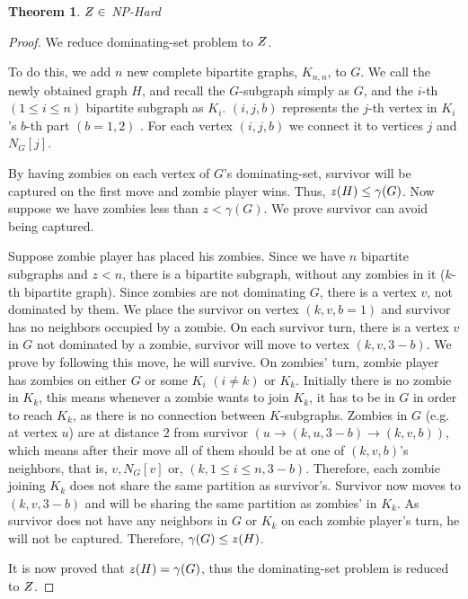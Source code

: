 \documentclass[1p]{elsarticle}
\newtheorem{theorem}{Theorem}
\newcommand{\NPZ}{\ooalign{$Z$\cr\hfil\rule[.8ex]{.3em}{.09ex}\hfil\cr}}
\newcommand{\zn}{\ooalign{$z$\cr\hfil\rule[.5ex]{.2em}{.08ex}\hfil\cr}}
\begin{document}
	\begin{theorem}
		$\NPZ \in$ NP-Hard
	\end{theorem}
	\begin{proof}
		We reduce dominating-set problem to $\NPZ$.

		To do this, we add $n$ new complete bipartite graphs, $K_{n,n}$, to $G$. We call the newly obtained graph $H$,
		and recall the $G$-subgraph simply as $G$, and the $i$-th $(1 \leq i \leq n)$ bipartite subgraph as $K_i$.
		$(i,j,b)$ represents the $j$-th vertex in $K_i$'s $b$-th part $(b = 1,2)$ . For each vertex $(i,j,b)$ we connect
		it to vertices $j$ and $N_G[j]$.

		By having zombies on each vertex of $G$'s dominating-set, survivor will be captured on the first move and zombie
		player wins. Thus, $\zn(H) \leq \gamma(G)$. Now suppose we have zombies less than $z < \gamma(G)$. We prove
		survivor can avoid being captured.

		Suppose zombie player has placed his zombies. Since we have $n$ bipartite subgraphs and $z < n$, there is a
		bipartite subgraph, without any zombies in it ($k$-th bipartite graph). Since zombies are not dominating $G$,
		there is a vertex $v$, not dominated by them. We place the survivor on vertex $(k,v,b = 1)$ and survivor has no
		neighbors occupied by a zombie. On each survivor turn, there is a vertex $v$ in $G$ not dominated by a zombie,
		survivor will move to vertex $(k,v,3 - b)$. We prove by following this move, he will survive. On zombies' turn,
		zombie player has zombies on either $G$ or some $K_i$ $(i \neq k)$ or $K_k$. Initially there is no zombie in
		$K_k$, this means whenever a zombie wants to join $K_k$, it has to be in $G$ in order to reach $K_k$, as there
		is no connection between $K$-subgraphs. Zombies in $G$ (e.g. at vertex $u$) are at distance 2 from survivor $(u
		\rightarrow (k,u,3 - b) \rightarrow (k,v,b))$, which means after their move all of them should be at one of
		$(k,v,b)$'s neighbors, that is, $v , N_G[v] $ or, $ (k,1 \leq i \leq n,3 - b)$. Therefore, each zombie joining
		$K_k$ does not share the same partition as survivor's. Survivor now moves to $(k,v,3-b)$ and will be sharing the
		same partition as zombies' in $K_k$. As survivor does not have any neighbors in $G$ or $K_k$ on each zombie
		player's turn, he will not be captured. Therefore, $\gamma(G) \leq \zn(H)$.

		It is now proved that $\zn(H) = \gamma(G)$, thus the dominating-set problem is reduced to $\NPZ$.

	\end{proof}
\end{document}
